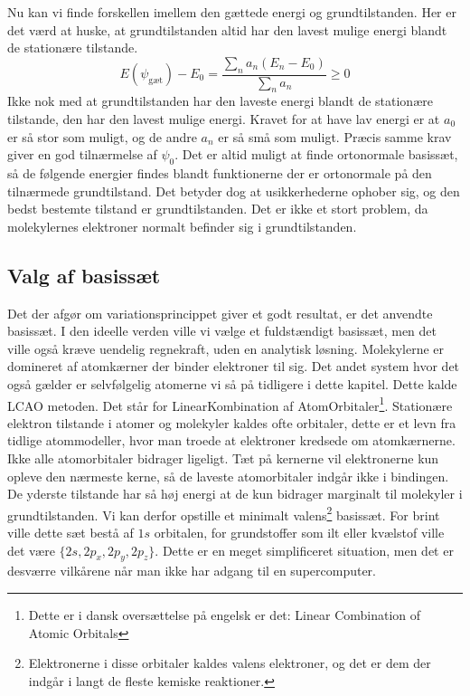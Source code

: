 \documentclass[../../Atom-ogMolekylefysik.tex]{subfiles}
\begin{document}
Nu kan vi finde forskellen imellem den gættede energi og grundtilstanden. Her er det værd at huske, at grundtilstanden altid har den lavest mulige energi blandt de stationære tilstande.
\begin{equation}
    E(\psi_\text{gæt})-E_0 = \frac{\sum_na_n(E_n-E_0)}{\sum_na_n}\geq 0
\end{equation}
Ikke nok med at grundtilstanden har den laveste energi blandt de stationære tilstande, den har den lavest mulige energi. Kravet for at have lav energi er at $a_0$ er så stor som muligt, og de andre $a_n$ er så små som muligt. Præcis samme krav giver en god tilnærmelse af $\psi_0$. 
Det er altid muligt at finde ortonormale basissæt, så de følgende energier findes blandt funktionerne der er ortonormale på den tilnærmede grundtilstand. Det betyder dog at usikkerhederne ophober sig, og den bedst bestemte tilstand er grundtilstanden. Det er ikke et stort problem, da molekylernes elektroner normalt befinder sig i grundtilstanden.
\subsection{Valg af basissæt}
Det der afgør om variationsprincippet giver et godt resultat, er det anvendte basissæt. I den ideelle verden ville vi vælge et fuldstændigt basissæt, men det ville også kræve uendelig regnekraft, uden en analytisk løsning. 
Molekylerne er domineret af atomkærner der binder elektroner til sig. Det andet system hvor det også gælder er selvfølgelig atomerne vi så på tidligere i dette kapitel. Dette kalde LCAO metoden. Det står for LinearKombination af AtomOrbitaler\footnote{Dette er i dansk oversættelse på engelsk er det: Linear Combination of Atomic Orbitals}. Stationære elektron tilstande i atomer og molekyler kaldes ofte orbitaler, dette er et levn fra tidlige atommodeller, hvor man troede at elektroner kredsede om atomkærnerne. Ikke alle atomorbitaler bidrager ligeligt. Tæt på kernerne vil elektronerne kun opleve den nærmeste kerne, så de laveste atomorbitaler indgår ikke i bindingen. De yderste tilstande har så høj energi at de kun bidrager marginalt til molekyler i grundtilstanden. Vi kan derfor opstille et minimalt valens\footnote{Elektronerne i disse orbitaler kaldes valens elektroner, og det er dem der indgår i langt de fleste kemiske reaktioner.} basissæt. For brint ville dette sæt bestå af $1s$ orbitalen, for grundstoffer som ilt eller kvælstof ville det være $\{2s,2p_x,2p_y,2p_z\}$. Dette er en meget simplificeret situation, men det er desværre vilkårene når man ikke har adgang til en supercomputer. 
\end{document}
